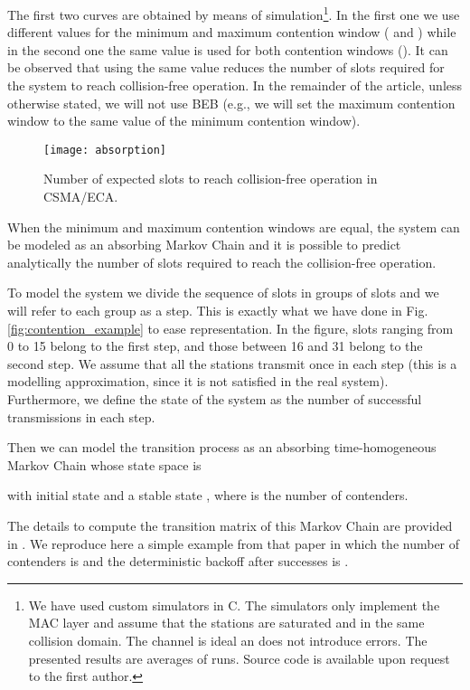 \documentclass[journal]{IEEEtran}
\begin{document}
The first two curves are obtained by means of simulation\footnote{We have used custom simulators in C. The simulators only implement the MAC layer and assume that the stations are saturated and in the same collision domain. The channel is ideal an does not introduce errors. The presented results are averages of  runs. Source code is available upon request to the first author.}. In the first one we use different values for the minimum and maximum contention window ( and ) while in the second one the same value is used for both contention windows (). It can be observed that using the same value reduces the number of slots required for the system to reach collision-free operation. In the remainder of the article, unless otherwise stated, we will not use BEB (e.g., we will set the maximum contention window to the same value of the minimum contention window).

\begin{figure}[!t]
\centering
\texttt{[image: absorption]}
\caption{Number of expected slots to reach collision-free operation in CSMA/ECA.}
\label{fig:absorption}
\end{figure}

When the minimum and maximum contention windows are equal, the system can be modeled as an absorbing Markov Chain and it is possible to predict analytically the number of slots required to reach the collision-free operation.

To model the system we divide the sequence of slots in groups of  slots and we will refer to each group as a step. This is exactly what we have done in Fig. \ref{fig:contention_example} to ease representation. In the figure, slots ranging from 0 to 15 belong to the first step, and those between 16 and 31 belong to the second step. We assume that all the stations transmit once in each step (this is a modelling approximation, since it is not satisfied in the real system). Furthermore, we define the state of the system as the number of successful transmissions in each step.

 Then we can model the transition process as an absorbing time-homogeneous Markov Chain whose state space is 

with initial state  and a stable state , where  is the number of contenders.

The details to compute the transition matrix  of this Markov Chain are provided in \cite{barcelo2010fcc}. We reproduce here a simple example from that paper in which the number of contenders is  and the deterministic backoff after successes is .
\end{document}
